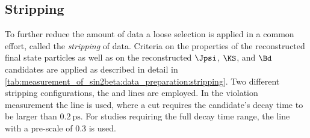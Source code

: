 \subsection{Stripping}
\label{sec:measurement_of_sin2beta:data_preparation:stripping}

To further reduce the amount of data a loose selection is applied in a common
effort, called the \emph{stripping} of data. Criteria on the properties of
the reconstructed final state particles as well as on the reconstructed $\Jpsi$,
$\KS$, and $\Bd$ candidates are applied as described in detail in 
\cref{tab:measurement_of_sin2beta:data_preparation:stripping}. Two different
stripping configurations, the \StrippingDetached and \StrippingPrescaled lines
are employed. In the \CP violation measurement the \StrippingDetached line is
used, where a cut requires the \Bd candidate's decay time to be larger than
$\SI{0.2}{\pico\second}$. For studies requiring the full decay time range, the
\StrippingPrescaled line with a pre-scale of $\num{0.3}$ is used.

